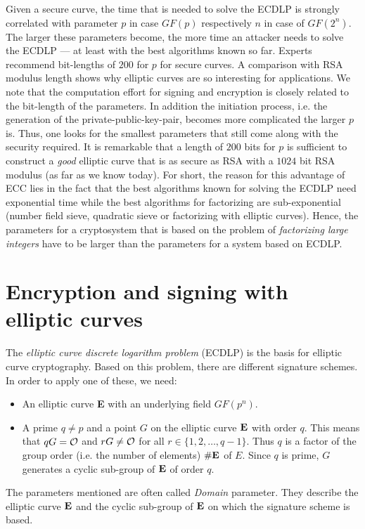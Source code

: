 Given a secure curve, the time that is needed to solve the ECDLP is strongly correlated with parameter $p$ in case $GF(p)$ respectively $n$ in case of $GF(2^n)$. The larger these parameters become, the more time an attacker needs to solve the ECDLP --- at least with the best algorithms known so far. Experts recommend bit-lengths of $200$ for $p$ for secure curves. A comparison with RSA modulus length shows why elliptic curves are so interesting for applications. We note that the computation effort for signing and encryption is closely related to the bit-length of the parameters. In addition the initiation process, i.e. the generation of the private-public-key-pair, becomes more complicated the larger $p$ is. Thus, one looks for the smallest parameters that still come along with the security required. It is remarkable that a length of $200$ bits for $p$ is sufficient to construct a {\em good} elliptic curve that is as secure as RSA with a $1024$ bit  RSA modulus (as far as we know today). For short, the reason for this advantage of ECC lies in the fact that the best algorithms known for solving the ECDLP need exponential time while the best algorithms for factorizing are sub-exponential (number field sieve, quadratic sieve or factorizing with elliptic curves). Hence, the parameters for a cryptosystem that is based on the problem of {\em factorizing large integers} have to be larger than the parameters for a system based on ECDLP.


\section{Encryption and signing with elliptic curves}

\begin{sloppypar}
  The {\em elliptic curve discrete logarithm
    problem} (ECDLP)  is the basis for elliptic curve cryptography. Based on this problem, there are different signature schemes. In order to apply one of these, we need:
\end{sloppypar}
\begin{itemize}
    \item An elliptic curve {\bf E} with an underlying field $GF(p^n)$.
    \item A prime $q\ne p$ and a point $G$ on the elliptic curve ${\bf E}$ with order $q$. This means that $qG={\cal O}$ and $rG\ne {\cal O}$ for all $r\in \{1,2,\dots,q-1\}$. Thus $q$ is a factor of the group order (i.e. the number of elements) $\#{\bf E}$ of $E$. Since $q$ is prime, $G$ generates a cyclic sub-group of ${\bf E}$ of order $q$.
\end{itemize}
The parameters mentioned are often called 
{\em Domain} parameter. They describe the elliptic curve ${\bf E}$ and 
the cyclic sub-group of ${\bf E}$ on which the signature scheme is based.

